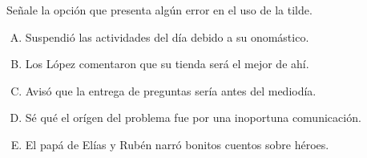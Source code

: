 Señale la opción que presenta algún error en el uso de la tilde.
\begin{enumerate}[A)]
	\item Suspendió las actividades del día debido a su onomástico.
	\item Los López comentaron que su tienda será el mejor de ahí.
	\item Avisó que la entrega de preguntas sería antes del mediodía.
	\item Sé qué el orígen del problema fue por una inoportuna comunicación.
	\item El papá de Elías y Rubén narró bonitos cuentos sobre héroes.
\end{enumerate}